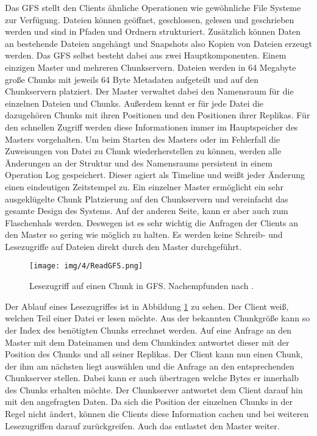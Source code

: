 \documentclass[12pt,oneside,a4paper,parskip]{scrbook}
\begin{document}
Das GFS stellt den Clients ähnliche Operationen wie gewöhnliche File Systeme zur Verfügung. Dateien können geöffnet, geschlossen, gelesen und geschrieben werden und sind in Pfaden und Ordnern strukturiert. Zusätzlich können Daten an bestehende Dateien angehängt und Snapshots also Kopien von Dateien erzeugt werden. Das GFS selbst besteht dabei aus zwei Hauptkomponenten. Einem einzigen Master und mehreren Chunkservern. Dateien werden in 64 Megabyte große Chunks mit jeweils 64 Byte Metadaten aufgeteilt und auf den Chunkservern platziert. Der Master verwaltet dabei den Namensraum für die einzelnen Dateien und Chunks. Außerdem kennt er für jede Datei die dazugehören Chunks mit ihren Positionen und den Positionen ihrer Replikas. Für den schnellen Zugriff werden diese Informationen immer im Hauptspeicher des Masters vorgehalten. Um beim Starten des Masters oder im Fehlerfall die Zuweisungen von Datei zu Chunk wiederherstellen zu können, werden alle Änderungen an der Struktur und des Namensraums persistent in einem Operation Log gespeichert. Dieser agiert als Timeline und weißt jeder Änderung einen eindeutigen Zeitstempel zu. Ein einzelner Master ermöglicht ein sehr ausgeklügelte Chunk Platzierung auf den Chunkservern und vereinfacht das gesamte Design des Systems. Auf der anderen Seite, kann er aber auch zum Flaschenhals werden. Deswegen ist es sehr wichtig die Anfragen der Clients an den Master so gering wie möglich zu halten. Es werden keine Schreib- und Lesezugriffe auf Dateien direkt durch den Master durchgeführt.

\begin{figure}[htb]
  \centering
  \texttt{[image: img/4/ReadGFS.png]}
  \caption[Lesezugriff auf einen Chunk in GFS]{Lesezugriff auf einen Chunk in GFS. Nachempfunden nach \cite{GFS}.}
  \label{readgfs}
\end{figure}

Der Ablauf eines Lesezugriffes ist in Abbildung \ref{readgfs} zu sehen. Der Client weiß, welchen Teil einer Datei er lesen möchte. Aus der bekannten Chunkgröße kann so der Index des benötigten Chunks errechnet werden. Auf eine Anfrage an den Master mit dem Dateinamen und dem Chunkindex antwortet dieser mit der Position des Chunks und all seiner Replikas. Der Client kann nun einen Chunk, der ihm am nächsten liegt auswählen und die Anfrage an den entsprechenden Chunkserver stellen. Dabei kann er auch übertragen welche Bytes er innerhalb des Chunks erhalten möchte. Der Chunkserver antwortet dem Client darauf hin mit den angefragten Daten. Da sich die Position der einzelnen Chunks in der Regel nicht ändert, können die Clients diese Information cachen und bei weiteren Lesezugriffen darauf zurückgreifen. Auch das entlastet den Master weiter.
\end{document}
